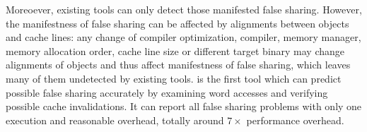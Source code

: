 Moreoever, existing tools can only detect those manifested false sharing.
However, the manifestness of false sharing can be affected by alignments between
objects and cache lines: any change of compiler optimization, compiler, memory manager, 
memory allocation order, cache line size or different target binary 
may change alignments of objects and thus affect manifestness of false sharing, 
which leaves many of them undetected by existing tools.
\Defaults{} is the first tool which can predict possible false sharing 
accurately by examining word accesses and verifying possible cache invalidations.   
It can report all false sharing problems with only one execution and reasonable overhead, totally 
around $7\times$ performance overhead.

